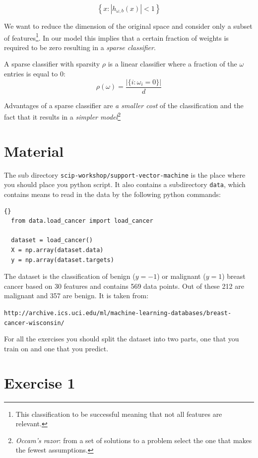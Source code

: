 \documentclass[11pt]{article}
\newcommand\abs[1]{\left|#1\right|}
\newcommand\ttt\texttt
\begin{document}
$$ \left\{ x : \abs{h_{\omega,b} (x)} < 1 \right\} $$

We want to reduce the dimension of the original space and consider only a subset of features\footnote{
  This classification to be successful meaning that not all features are relevant.}.
In our model this implies that a certain fraction of weights is required to be zero resulting in a \emph{sparse classifier}.


A sparse classifier with sparsity $\rho$ is a linear classifier where a fraction of the $\omega$ entries is equal to 0:
$$ \rho(\omega) = \frac{\abs{\{ i \colon \omega_{i} = 0 \}}}{d} $$

Advantages of a sparse classifier are \emph{a smaller cost} of the classification and the fact that it results in a \emph{simpler model}\footnote{\emph{Occam's razor}: from a set of solutions to a problem select the one that makes the fewest assumptions.}

\section*{Material}

The sub directory \ttt{scip-workshop/support-vector-machine} is the place where you should place you python script.
It also contains a subdirectory \ttt{data}, which contains means to read in the data by the following python commands:

\begin{lstlisting}[frame=tb]{}
  from data.load_cancer import load_cancer

  dataset = load_cancer()
  X = np.array(dataset.data)
  y = np.array(dataset.targets)
\end{lstlisting}

The dataset is the classification of benign ($y=-1$) or malignant ($y=1$) breast cancer based on 30 features and contains 569 data points.
Out of these 212 are malignant and 357 are benign.
It is taken from:

\begin{center}
  \ttt{\small http://archive.ics.uci.edu/ml/machine-learning-databases/breast-cancer-wisconsin/}
\end{center}

For all the exercises you should split the dataset into two parts, one that you train on and one that you predict.

\section*{Exercise 1}
\end{document}
